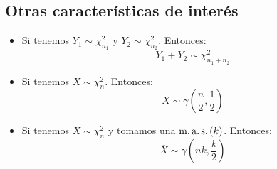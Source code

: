 \subsection{Otras características de interés}
\begin{itemize}
    \item Si tenemos $Y_1 \sim \chi^2_{n_1}$ y $Y_2 \sim \chi^2_{n_2}$. Entonces:
    \[
    Y_1 + Y_2 \sim \chi^2_{n_1 + n_2}
    \]
    \item Si tenemos $X \sim \chi^2_n$. Entonces:
    \[
    X \sim \gamma\left( \frac{n}{2}, \frac{1}{2} \right)
    \]
    \item Si tenemos $X \sim \chi^2_n$ y tomamos una $\operatorname{m.a.s.}\left( k \right)$. Entonces:
    \[
    \overline{X} \sim \gamma\left( nk, \frac{k}{2} \right)
    \]
\end{itemize}
